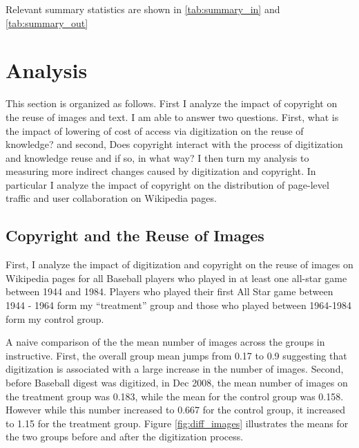 \documentclass[12pt]{article}
\begin{document}
Relevant summary statistics are shown in \ref{tab:summary_in} and \ref{tab:summary_out}


\label{tab:summary_out}


\label{tab:summary_in}



\section{Analysis}

This section is organized as follows. First I analyze the impact of copyright on the reuse of images and text. I am able to answer two questions. First, what is the impact of lowering of cost of access via digitization on the reuse of knowledge? and second, Does copyright interact with the process of digitization and knowledge reuse and if so, in what way? I then turn my analysis to measuring more indirect changes caused by digitization and copyright. In particular I analyze the impact of copyright on the distribution of page-level traffic and user collaboration on Wikipedia pages. 

\subsection{Copyright and the Reuse of Images}

First, I analyze the impact of digitization and copyright on the reuse of images on Wikipedia pages for all Baseball players who played in at least one all-star game between 1944 and 1984. Players who played their first All Star game between 1944 - 1964 form my ``treatment'' group and those who played between 1964-1984 form my control group. 

A naive comparison of the the mean number of images across the groups in instructive. First, the overall group mean jumps from 0.17 to 0.9 suggesting that digitization is associated with a large increase in the number of images. Second, before Baseball digest was digitized, in Dec 2008, the mean number of images on the treatment group was 0.183, while the mean for the control group was 0.158. However while this number increased to 0.667 for the control group, it increased to 1.15 for the treatment group. Figure \ref{fig:diff_images} illustrates the means for the two groups before and after the digitization process. 
\end{document}
